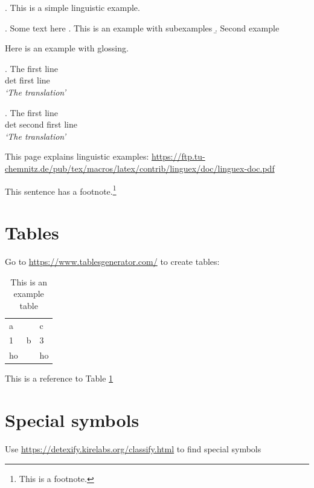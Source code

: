 \ex. \label{ex:intro:ex1} This is a simple linguistic example. 

\ex. Some text here 
\a. This is an example with subexamples
    \b. Second example


Here is an example with glossing.

\exg. The first line \\
    det first line \\
    \trans \textit{`The translation'}

\exg. The first line \\
    det {second first} line \\
    \trans \textit{`The translation'}

    This page explains linguistic examples: \url{https://ftp.tu-chemnitz.de/pub/tex/macros/latex/contrib/linguex/doc/linguex-doc.pdf}

    This sentence has a footnote.\footnote{This is a footnote.}

    \section{Tables}

    Go to \url{https://www.tablesgenerator.com/} to create tables:

    \begin{table}[]
    \centering
\begin{tabular}{l||ll}
a  & \multirow{3}{*}{b} & c  \\
1  &                    & 3  \\
ho &                    & ho
\end{tabular}
\caption{This is an example table}
\label{table:hohoho}
\end{table}

This is a reference to Table \ref{table:hohoho}

\section{Special symbols}

Use \url{https://detexify.kirelabs.org/classify.html} to find special symbols